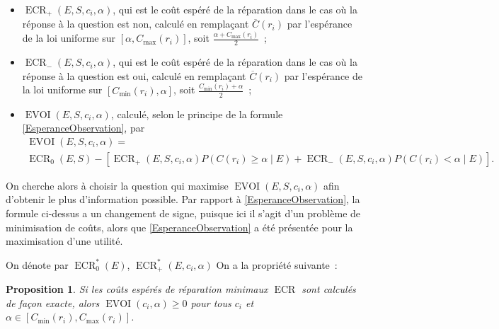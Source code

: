 \documentclass[a4paper,11pt]{article}
\theoremstyle{plain}
\newtheorem*{prop}{Proposition}
\theoremstyle{definition}
\DeclareMathOperator{\ECR}{ECR}
\DeclareMathOperator{\EVOI}{EVOI}
\begin{document}
\begin{itemize}
\item $\ECR_+(E, S, c_i, \alpha)$, qui est le coût espéré de la réparation dans le cas où la réponse à la question est non, calculé en remplaçant $\overline C(r_i)$ par l'espérance de la loi uniforme sur $[\alpha, C_{\max}(r_i)]$, soit $\frac{\alpha + C_{\max}(r_i)}{2}$~;
\item $\ECR_-(E, S, c_i, \alpha)$, qui est le coût espéré de la réparation dans le cas où la réponse à la question est oui, calculé en remplaçant $\overline C(r_i)$ par l'espérance de la loi uniforme sur $[C_{\min}(r_i), \alpha]$, soit $\frac{C_{\min}(r_i) + \alpha}{2}$~;
\item $\EVOI(E, S, c_i, \alpha)$, calculé, selon le principe de la formule \eqref{EsperanceObservation}, par
\begin{multline*}
\EVOI(E, S, c_i, \alpha) = \\ \ECR_0(E, S) - \left[\ECR_+(E, S, c_i, \alpha) P(C(r_i) \geq \alpha \mid E) + \ECR_-(E, S, c_i, \alpha) P(C(r_i) < \alpha \mid E)\right].
\end{multline*}
\end{itemize}
On cherche alors à choisir la question qui maximise $\EVOI(E, S, c_i, \alpha)$ afin d'obtenir le plus d'information possible. Par rapport à \eqref{EsperanceObservation}, la formule ci-dessus a un changement de signe, puisque ici il s'agit d'un problème de minimisation de coûts, alors que \eqref{EsperanceObservation} a été présentée pour la maximisation d'une utilité.

On dénote par $\ECR_0^\ast(E)$, $\ECR_+^\ast(E, c_i, \alpha)$
 On a la propriété suivante~:

\begin{prop}
Si les coûts espérés de réparation minimaux $\ECR$ sont calculés de façon exacte, alors $\EVOI(c_i, \alpha) \geq 0$ pour tous $c_i$ et $\alpha \in [C_{\min}(r_i), C_{\max}(r_i)]$.
\end{prop}
\end{document}
